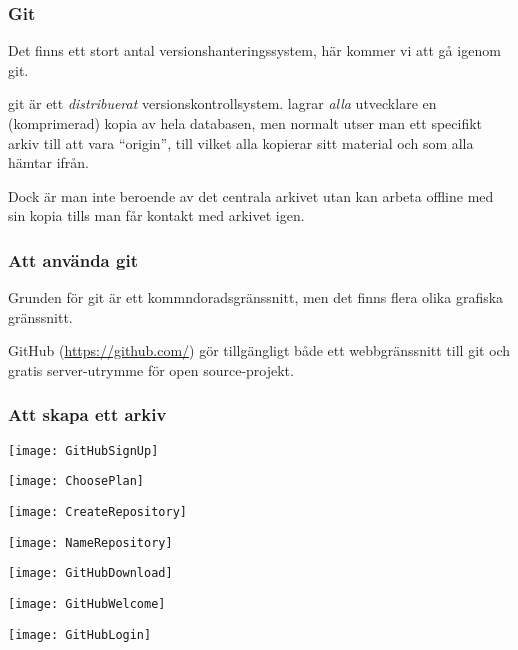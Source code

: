 \documentclass[swedish]{beamer}
\begin{document}
\begin{frame}
\frametitle{Git}
Det finns ett stort antal versionshanteringssystem, här kommer vi att gå igenom git.

  git är ett \emph{distribuerat} versionskontrollsystem.  \Mao lagrar \emph{alla} utvecklare en (komprimerad) kopia av hela databasen, men normalt utser man ett specifikt arkiv till att vara ``origin'', till vilket alla kopierar sitt material och som alla hämtar ifrån.

Dock är man inte beroende av det centrala arkivet utan kan arbeta offline med sin kopia tills man får kontakt med arkivet igen.

\end{frame}

\begin{frame}
  \frametitle{Att använda git}
Grunden för git är ett kommndoradsgränssnitt, men det finns flera olika grafiska gränssnitt.

GitHub (\url{https://github.com/}) gör tillgängligt både ett webbgränssnitt till git och gratis server-utrymme för open source-projekt.

\end{frame}


\begin{frame}
\frametitle{Att skapa ett arkiv}
\texttt{[image: GitHubSignUp]}
\end{frame}

\begin{frame}[fragile]
\texttt{[image: ChoosePlan]}
\end{frame}


\begin{frame}[fragile]
\texttt{[image: CreateRepository]}  
\end{frame}

\begin{frame}[fragile]
\texttt{[image: NameRepository]}
\end{frame}

\begin{frame}[fragile]
\texttt{[image: GitHubDownload]}

\end{frame}

\begin{frame}[fragile]
\texttt{[image: GitHubWelcome]}
\end{frame}

\begin{frame}[fragile]
\texttt{[image: GitHubLogin]}
\end{frame}
\end{document}
